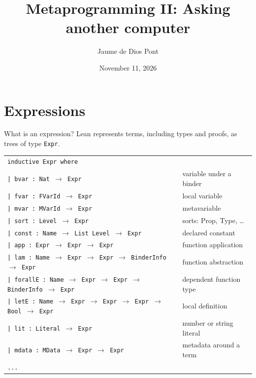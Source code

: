 \documentclass[aspectratio=169,11pt]{beamer}
\title{Metaprogramming II: Asking another computer}
\author{Jaume de Dios Pont}
\institute{New York University}
\date{November 11, 2026}
\newcommand{\code}[1]{\texttt{#1}}
\begin{document}
\section{Expressions}
\begin{frame}{What is an expression?}
  Lean represents terms, including types and proofs, as trees of type \code{Expr}.

  \vspace{2mm}
  {\fontsize{8}{10}\selectfont
  \renewcommand{\arraystretch}{1.05}
  \setlength{\tabcolsep}{6pt}
  \begin{tabular}{@{}ll@{}}
    \code{inductive Expr where} & \\
    \code{\phantom{xx}| bvar\phantom{xxx} : Nat $\to$ Expr} & variable under a binder \\
    \code{\phantom{xx}| fvar\phantom{xxx} : FVarId $\to$ Expr} & local variable \\
    \code{\phantom{xx}| mvar\phantom{xxx} : MVarId $\to$ Expr} & metavariable \\
    \code{\phantom{xx}| sort\phantom{xxx} : Level $\to$ Expr} & sorts: Prop, Type, \ldots \\
    \code{\phantom{xx}| const\phantom{xx} : Name $\to$ List Level $\to$ Expr} & declared constant \\
    \code{\phantom{xx}| app\phantom{xxxx} : Expr $\to$ Expr $\to$ Expr} & function application \\
    \code{\phantom{xx}| lam\phantom{xxxx} : Name $\to$ Expr $\to$ Expr $\to$ BinderInfo $\to$ Expr} & function abstraction \\
    \code{\phantom{xx}| forallE : Name $\to$ Expr $\to$ Expr $\to$ BinderInfo $\to$ Expr} & dependent function type \\
    \code{\phantom{xx}| letE\phantom{xxx} : Name $\to$ Expr $\to$ Expr $\to$ Expr $\to$ Bool $\to$ Expr} & local definition \\
    \code{\phantom{xx}| lit\phantom{xxxx} : Literal $\to$ Expr} & number or string literal \\
    \code{\phantom{xx}| mdata\phantom{xx} : MData $\to$ Expr $\to$ Expr} & metadata around a term \\
    \code{\phantom{xx}...} &
  \end{tabular}}



\end{frame}
\end{document}
